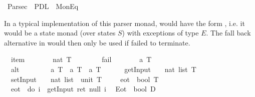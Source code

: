 %
\begin{isabellebody}%
\def\isabellecontext{Parsec}%
%
\isamarkuptrue%
\ Parsec\ {\isacharequal}\ PDL\ {\isacharplus}\ MonEq{\isacharcolon}\isamarkupfalse%
%
\label{sec:parsec-thy}
%
\begin{isamarkuptext}%
In a typical implementation of this parser monad,  would have the 
  form , i.e. it would be a state monad (over states
  $S$) with exceptions of type $E$. The fall back alternative  in
   would then only be used if  failed to terminate.
  \label{isa:parsec-spec}%
\end{isamarkuptext}%
\isamarkuptrue%
\isanewline
\ \ item\ \ \ \ \ \ \ {\isacharcolon}{\isacharcolon}\ {\isachardoublequote}nat\ T{\isachardoublequote}\ \ \ \ \ \ %
\isanewline
\ \ fail\ \ \ \ \ \ \ {\isacharcolon}{\isacharcolon}\ {\isachardoublequote}{\isacharprime}a\ T{\isachardoublequote}\ \ \ \ \ \ \ %
\isanewline
\ \ alt\ \ \ \ \ \ \ \ {\isacharcolon}{\isacharcolon}\ {\isachardoublequote}{\isacharprime}a\ T\ {\isasymRightarrow}\ {\isacharprime}a\ T\ {\isasymRightarrow}\ {\isacharprime}a\ T{\isachardoublequote}\ {\isacharparenleft}\ {\isachardoublequote}{\isasymparallel}{\isachardoublequote}\ {}{}{}{\isacharparenright}\ %
\isanewline
\ \ getInput\ \ \ {\isacharcolon}{\isacharcolon}\ {\isachardoublequote}nat\ list\ T{\isachardoublequote}\ %
\isanewline
\ \ setInput\ \ \ {\isacharcolon}{\isacharcolon}\ {\isachardoublequote}nat\ list\ {\isasymRightarrow}\ unit\ T{\isachardoublequote}\ \isanewline
\isanewline
\isanewline
\isamarkupfalse%
\ \isanewline
\ \ eot\ {\isacharcolon}{\isacharcolon}\ {\isachardoublequote}bool\ T{\isachardoublequote}\isanewline
\ \ {\isachardoublequote}eot\ {\isasymequiv}\ {\isacharparenleft}do\ {\isacharbraceleft}i\ {\isasymleftarrow}\ getInput{\isacharsemicolon}\ ret\ {\isacharparenleft}null\ i{\isacharparenright}{\isacharbraceright}{\isacharparenright}{\isachardoublequote}\isanewline
\ \ Eot\ {\isacharcolon}{\isacharcolon}\ {\isachardoublequote}bool\ D{\isachardoublequote}\isanewline

\end{isabellebody}
